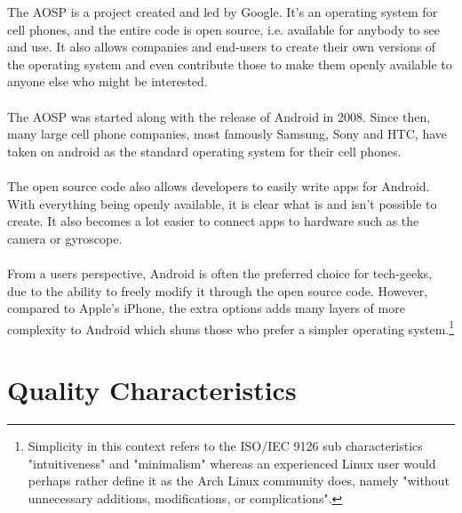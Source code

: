 \documentclass[conference]{IEEEtran}
\begin{document}
The AOSP is a project created and led by Google. It's an operating system for cell phones, and the entire code is open source, i.e. available for anybody to see and use. It also allows companies and end-users to create their own versions of the operating system and even contribute those to make them openly available to anyone else who might be interested.\cite{android} 
\\\\The AOSP was started along with the release of Android in 2008. Since then, many large cell phone companies, most famously Samsung, Sony and HTC, have taken on android as the standard operating system for their cell phones. 
\\\\The open source code also allows developers to easily write apps for Android. With everything being openly available, it is clear what is and isn't possible to create. It also becomes a lot easier to connect apps to hardware such as the camera or gyroscope.
\\\\From a users perspective, Android is often the preferred choice for tech-geeks, due to the ability to freely modify it through the open source code. However, compared to Apple's iPhone, the extra options adds many layers of more complexity to Android which shuns those who prefer a simpler operating system.\footnote{Simplicity in this context refers to the ISO/IEC 9126\cite{jung2004} sub characteristics "intuitiveness" and "minimalism" whereas an experienced Linux user would perhaps rather define it as the Arch Linux community does, namely "without unnecessary additions, modifications, or complications".\cite{archway}} 

\section{Quality Characteristics}
\label{quality}
\end{document}
